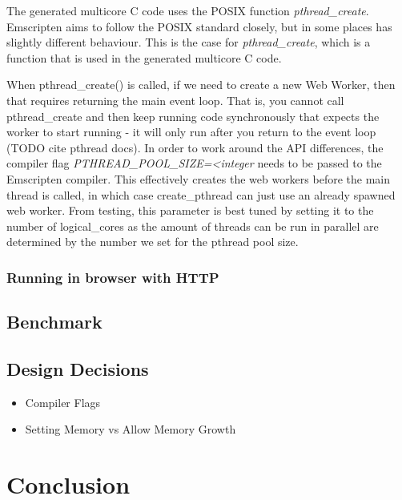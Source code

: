 \documentclass[11pt]{article}
\begin{document}
The generated multicore C code uses the POSIX function \textit{pthread\_create}. Emscripten aims to follow the POSIX standard closely, but in some places has slightly different behaviour. This is the case for \textit{pthread\_create}, which is a function that is used in the generated multicore C code. 

When pthread\_create() is called, if we need to create a new Web Worker, then that requires returning the main event loop. That is, you cannot call pthread\_create and then keep running code synchronously that expects the worker to start running - it will only run after you return to the event loop (TODO cite pthread docs). In order to work around the API differences, the compiler flag \textit{PTHREAD\_POOL\_SIZE=<integer} needs to be passed to the Emscripten compiler. This effectively creates the web workers before the main thread is called, in which case create\_pthread can just use an already spawned web worker. From testing, this parameter is best tuned by setting it to the number of logical\_cores as the amount of threads can be run in parallel are determined by the number we set for the pthread pool size. 



\subsubsection{Running in browser with HTTP}



\subsection{Benchmark}




\subsection{Design Decisions}
\begin{itemize}
    \item Compiler Flags
    \item Setting Memory vs Allow Memory Growth
\end{itemize}

\section{Conclusion}
\end{document}
